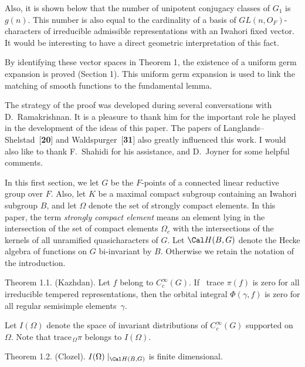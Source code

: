 Also, it is shown below that the number of unipotent conjugacy classes of
$G_1$ is 
    $ g(n) $.
    This number is also
  equal to the cardinality of a basis of $GL(n,O_F)$-characters
  of irreducible admissible representations with an Iwahori fixed vector.
It would be interesting to have a direct geometric interpretation of 
  this fact.

By identifying these vector spaces in Theorem 1, the existence of
  a uniform germ expansion is proved (Section 1).
This uniform germ expansion is used to link the matching of 
  smooth functions to the fundamental lemma.

The strategy of the proof was developed during several conversations
  with D.~Ramakrishnan.
It is a pleasure to thank him for the important role he played in
  the development of the ideas of this paper.
The papers of Langlands--Shelstad~[{\bf 20}] and Waldspurger~[{\bf 31}]
  also greatly influenced this work.
I would also like to thank F.~Shahidi for his assistance, and D.~Joyner 
  for some helpful comments.

\newpage
\noindent
{}


\medskip
\noindent
In this first section, we let $G$ be the $F$-points of a 
  connected linear reductive group over $F$. Also, let $K$ 
  be a maximal
  compact subgroup containing an Iwahori subgroup $B$, and
let
   $ \Omega $
denote the set of strongly compact elements.  In this paper, the term
{\it strongly compact element} means an element lying in the
intersection of the set of compact elements $\Omega_c$ with
the intersections of the kernels of all unramified quasicharacters of $G$.
Let 
  $ {\Cal H} (B,G) $
denote the Hecke algebra of functions on $G$ bi-invariant
  by $B$.
Otherwise we retain the notation of the introduction.

\proclaim Theorem {1.1.} {\rm (Kazhdan)}.
Let
  $ f$ belong to $C_c^{\infty} (G) $.
If \, {\rm trace}
  $ \pi (f)$ is zero 
for all irreducible tempered representations, then the orbital integral
  $ \Phi (\gamma,f) $ is zero
for all regular semisimple elements~$ \gamma $.
\finishproclaim

Let
  $ I (\Omega) $
denote the space of invariant distributions of
  $ C_c^{\infty} (G) $
supported on $\Omega$.
Note that 
  $ \text{trace}_{\,\Omega} \pi $ belongs to $I(\Omega) $.

\proclaim Theorem {1.2.} {\rm (Clozel)}.
  $ I (\Omega) \mid_{{\Cal H}(B,G)} $
is finite dimensional.
\finishproclaim

